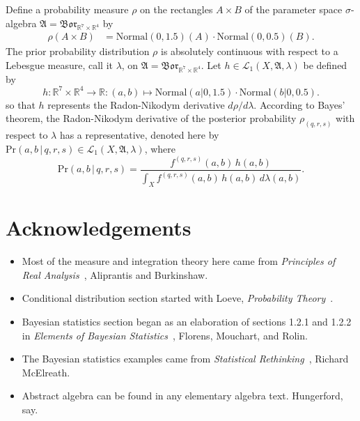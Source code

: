 \documentclass[
twoside=true,
paper=letter,
fontsize=9pt,
pagesize=auto,
leqno,
openany,
headsepline,
overfullrule,
]{scrbook}
\theoremstyle{plain}
\theoremstyle{plain}
\theoremstyle{definition}
\theoremstyle{bfnoteitalic}
\theoremstyle{bfnoteroman}
\newcommand{\sigalg}[1]{\mathfrak{#1}}
\newcommand{\cali}[1]{\mathscr{#1}}
\newcommand{\borel}{\mathfrak{Bor}}
\newcommand{\textsigma}{\hbox{\large{$\sigma$}}\kern-1pt}
\newcommand{\R}{\mathbb{R}}
\newcommand{\function}{f}
\newcommand{\functioniii}{h}
\newcommand{\measurespace}{X}
\newcommand{\seti}{A}
\newcommand{\setii}{B}
\newcommand{\pspace}{\measurespace}%
\newcommand{\pspacesig}{\sigalg{A}}
\begin{document}
Define a probability measure $\rho$ on the rectangles 
$\seti\times\setii$ of the parameter space \textsigma-algebra 
$\pspacesig=\borel_{\R^7\times\R^4}$ by
\begin{align*}
\rho(\seti\times\setii)
&=
\text{Normal}(0,1.5)(\seti)\cdot
\text{Normal}(0,0.5)(\setii).
\end{align*}
The prior probability distribution $\rho$ is absolutely continuous with respect to a Lebesgue measure, call it
$\lambda$, on $\pspacesig=\borel_{\R^7\times\R^4}$.
Let $\functioniii\in\cali{L}_1(\pspace,\pspacesig,\lambda)$ be defined by
\[
\functioniii:\R^7\times\R^4\to\R:(a,b)\mapsto
\text{Normal}(a\vert 0,1.5)\cdot
\text{Normal}(b\vert 0,0.5).
\]
so that $\functioniii$ represents the Radon-Nikodym derivative $d\rho/d\lambda$.
According to Bayes' theorem, the Radon-Nikodym derivative of the posterior probability 
$\rho_{(q,r,s)}$ with respect to $\lambda$ has a representative, denoted here by 
$\text{Pr}(a,b\,\vert\, q,r,s)\in\cali{L}_1(\pspace, \pspacesig,\lambda)$,
where
\[
\text{Pr}(a,b\,\vert\, q,r,s)
=
\frac{\function^{(q,r,s)}(a,b)\,\functioniii(a,b)}
{\int_{\pspace}\function^{(q,r,s)}(a,b)\,\functioniii(a,b)\,d\lambda(a,b)}.
\]


















\chapter{Acknowledgements}
\begin{itemize}
\item
Most of the measure and integration theory here came from
\textsl{Principles of Real Analysis}~\cite{pora_aliprantis_1990}, Aliprantis and Burkinshaw.
\item
Conditional distribution section started with Loeve,
\textsl{Probability Theory}~\cite{pt_loeve_1960}.
\item
Bayesian statistics section began as an elaboration of sections 1.2.1 and 1.2.2 in
\textsl{Elements of Bayesian Statistics}~\cite{eobs_florens_1990}, Florens, Mouchart, and Rolin.
\item
The Bayesian statistics examples came from
\textsl{Statistical Rethinking}~\cite{sr_mcelreath_2020}, Richard McElreath.
\item
Abstract algebra can be found in any elementary algebra text. Hungerford, say.
\end{itemize}
\end{document}
